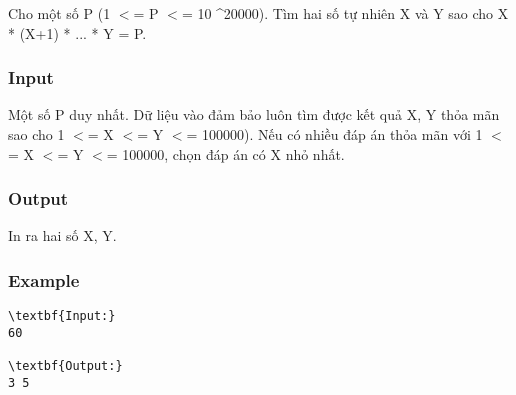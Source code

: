 



   Cho một số P (1 $<$= P $<$= 10 \textasciicircum 20000). Tìm hai số tự nhiên X và Y sao cho X * (X+1) * ... * Y = P.  

\subsubsection{   Input  }

   Một số P duy nhất. Dữ liệu vào đảm bảo luôn tìm được kết quả X, Y thỏa mãn sao cho 1 $<$= X $<$= Y $<$= 100000). Nếu có nhiều đáp án thỏa mãn với 1 $<$= X $<$= Y $<$= 100000, chọn đáp án có X nhỏ nhất.  

\subsubsection{   Output  }

   In ra hai số X, Y.  

\subsubsection{   Example  }
\begin{verbatim}
\textbf{Input:}
60

\textbf{Output:}
3 5
\end{verbatim}